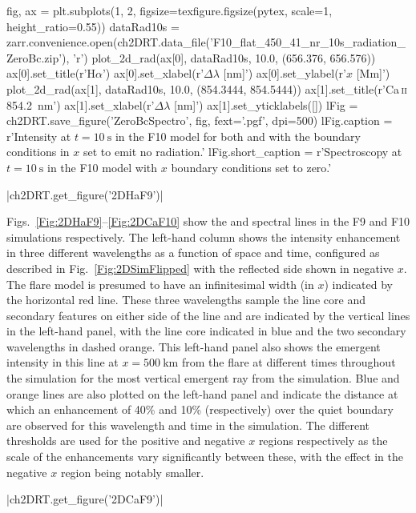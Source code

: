 \begin{pycode}[2DRT]
fig, ax = plt.subplots(1, 2, figsize=texfigure.figsize(pytex, scale=1, height_ratio=0.55))
dataRad10s = zarr.convenience.open(ch2DRT.data_file('F10_flat_450_41_nr_10s_radiation_ZeroBc.zip'), 'r')
plot_2d_rad(ax[0], dataRad10s, 10.0, (656.376, 656.576))
ax[0].set_title(r'H$\alpha$')
ax[0].set_xlabel(r'$\Delta\lambda$ [nm]')
ax[0].set_ylabel(r'$x$ [Mm]')
plot_2d_rad(ax[1], dataRad10s, 10.0, (854.3444, 854.5444))
ax[1].set_title(r'Ca\,\textsc{ii} \SI{854.2}{\nano\metre}')
ax[1].set_xlabel(r'$\Delta\lambda$ [nm]')
ax[1].set_yticklabels([])
lFig = ch2DRT.save_figure('ZeroBcSpectro', fig, fext='.pgf', dpi=500)
lFig.caption = r'Intensity at $t=\SI{10}{\second}$ in the F10 model for both \Ha{} and \CaLine{} with the boundary conditions in $x$ set to emit no radiation.'
lFig.short_caption = r'Spectroscopy at $t=\SI{10}{\second}$ in the F10 model with $x$ boundary conditions set to zero.'
\end{pycode}

\py[2DRT]|ch2DRT.get_figure('2DHaF9')|

Figs.~\ref{Fig:2DHaF9}--\ref{Fig:2DCaF10} show the \Ha{} and \CaLine{} spectral lines in the F9 and F10 simulations respectively.
The left-hand column shows the intensity enhancement in three different wavelengths as a function of space and time, configured as described in Fig.~\ref{Fig:2DSimFlipped} with the reflected side shown in negative $x$.
The flare model is presumed to have an infinitesimal width (in $x$) indicated by the horizontal red line.
These three wavelengths sample the line core and secondary features on either side of the line and are indicated by the vertical lines in the left-hand panel, with the line core indicated in blue and the two secondary wavelengths in dashed orange.
This left-hand panel also shows the emergent intensity in this line at $x=\SI{500}{\kilo\metre}$ from the flare at different times throughout the simulation for the most vertical emergent ray from the simulation.
Blue and orange lines are also plotted on the left-hand panel and indicate the distance at which an enhancement of 40\% and 10\% (respectively) over the quiet boundary are observed for this wavelength and time in the simulation.
The different thresholds are used for the positive and negative $x$ regions respectively as the scale of the enhancements vary significantly between these, with the effect in the negative $x$ region being notably smaller.

\py[2DRT]|ch2DRT.get_figure('2DCaF9')|

